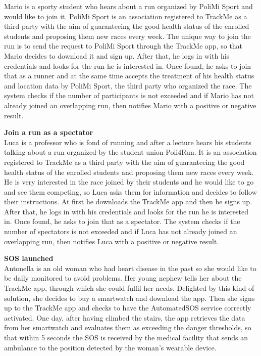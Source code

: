 \documentclass{article}
\begin{document}
\begin{legal}
\begin{legal}
\begin{legal}
{\begin{legal}
Mario is a sporty student who hears about a run organized by PoliMi Sport and would like to join it. PoliMi Sport is an association registered to TrackMe as a third party with the aim of guaranteeing the good health status of the enrolled students and proposing them new races every week. The unique way to join the run is to send the request to PoliMi Sport through the TrackMe app, so that Mario decides to download it and sign up. After that, he logs in with his credentials and looks for the run he is interested in. Once found, he asks to join that as a runner and at the same time accepts the treatment of his health status and location data by PoliMi Sport, the third party who organized the race. The system checks if the number of participants is not exceeded and if Mario has not already joined an overlapping run, then notifies Mario with a positive or negative result.\\

		\item \textbf{Join a run as a spectator}\\

Luca is a professor who is fond of running and after a lecture hears his students talking about a run organized by the student union Poli4Run. It is an association registered to TrackMe as a third party with the aim of guaranteeing the good health status of the enrolled students and proposing them new races every week. He is very interested in the race joined by their students and he would like to go and see them competing, so Luca asks them for information and decides to follow their instructions. At first he downloads the TrackMe app and then he signs up. After that, he logs in with his credentials and looks for the run he is interested in. Once found, he asks to join that as a spectator. The system checks if the number of spectators is not exceeded and if Luca has not already joined an overlapping run, then notifies Luca with a positive or negative result.\\

		\item \textbf{SOS launched}\\

Antonella is an old woman who had heart disease in the past so she would like to be daily monitored to avoid problems. Her young nephew tells her about the TrackMe app, through which she could fulfil her needs. Delighted by this kind of solution, she decides to buy a smartwatch and download the app. Then she signs up to the TrackMe app and checks to have the AutomatedSOS service correctly activated. One day, after having climbed the stairs, the app retrieves the data from her smartwatch and evaluates them as exceeding the danger thresholds, so that within 5 seconds the SOS is received by the medical facility that sends an ambulance to the position detected by the woman’s wearable device.\\



\end{legal}}
\end{legal}
\end{legal}
\end{legal}
\end{document}
